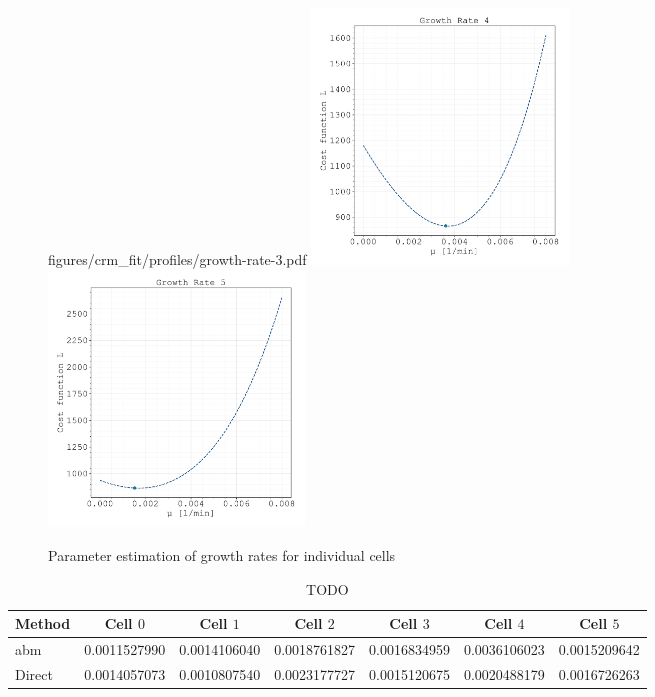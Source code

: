 \documentclass{article}
\begin{document}
\begin{figure}
        {figures/crm_fit/profiles/growth-rate-3.pdf}%
    \includegraphics[width=0.33\textwidth]
        {figures/crm_fit/profiles/growth-rate-4.pdf}%
    \includegraphics[width=0.33\textwidth]
        {figures/crm_fit/profiles/growth-rate-5.pdf}
    \caption{Parameter estimation of growth rates for individual cells}%
    \label{fig:parameter-estimates-supplement-growth-rates}
\end{figure}

\begin{table}
    \centering
    \begin{tabularx}{\textwidth}{l c c c c c c}
        \toprule
        Method & Cell $0$ & Cell $1$ & Cell $2$ & Cell $3$ & Cell $4$ & Cell $5$\\
        \midrule
        \ac{abm} & 0.0011527990 & 0.0014106040 & 0.0018761827 & 0.0016834959 & 0.0036106023 & 0.0015209642\\
        Direct   & 0.0014057073 & 0.0010807540 & 0.0023177727 & 0.0015120675 & 0.0020488179 & 0.0016726263\\
        \bottomrule
    \end{tabularx}
    \caption{TODO}
\end{table}

\end{document}
